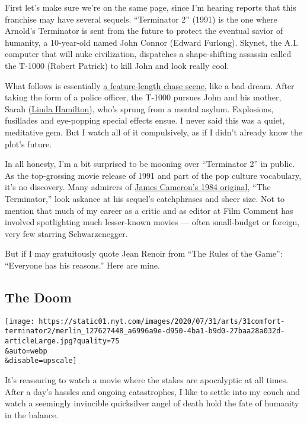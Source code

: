 First let's make sure we're on the same page, since I'm hearing reports
that this franchise may have several sequels. ``Terminator 2'' (1991) is
the one where Arnold's Terminator is sent from the future to protect the
eventual savior of humanity, a 10-year-old named John Connor (Edward
Furlong). Skynet, the A.I. computer that will nuke civilization,
dispatches a shape-shifting assassin called the T-1000 (Robert Patrick)
to kill John and look really cool.

What follows is essentially
\href{https://www.nytimes.com/2020/07/01/movies/movie-car-chase-scenes.html}{a
feature-length chase scene}, like a bad dream. After taking the form of
a police officer, the T-1000 pursues John and his mother, Sarah
(\href{https://www.nytimes.com/2019/09/03/movies/linda-hamilton-terminator.html}{Linda
Hamilton}), who's sprung from a mental asylum. Explosions, fusillades
and eye-popping special effects ensue. I never said this was a quiet,
meditative gem. But I watch all of it compulsively, as if I didn't
already know the plot's future.

In all honesty, I'm a bit surprised to be mooning over ``Terminator 2''
in public. As the top-grossing movie release of 1991 and part of the pop
culture vocabulary, it's no discovery. Many admirers of
\href{https://www.youtube.com/watch?v=QIcomuI1j7I}{James Cameron's 1984
original}, ``The Terminator,'' look askance at his sequel's catchphrases
and sheer size. Not to mention that much of my career as a critic and as
editor at Film Comment has involved spotlighting much lesser-known
movies --- often small-budget or foreign, very few starring
Schwarzenegger.

But if I may gratuitously quote Jean Renoir from ``The Rules of the
Game'': ``Everyone has his reasons.'' Here are mine.

\hypertarget{the-doom}{%
\subsection{The Doom}\label{the-doom}}

\texttt{[image: https://static01.nyt.com/images/2020/07/31/arts/31comfort-terminator2/merlin\_127627448\_a6996a9e-d950-4ba1-b9d0-27baa28a032d-articleLarge.jpg?quality=75\\\&auto=webp\\\&disable=upscale]}

It's reassuring to watch a movie where the stakes are apocalyptic at all
times. After a day's hassles and ongoing catastrophes, I like to settle
into my couch and watch a seemingly invincible quicksilver angel of
death hold the fate of humanity in the balance.

